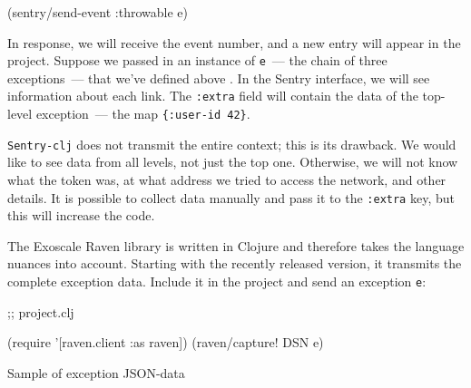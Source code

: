 \begin{clojure}
(sentry/send-event {:throwable e})
\end{clojure}

In response, we will receive the event number, and a new entry will appear in the project.
Suppose we passed in an instance of \verb|e|~--- the chain of three exceptions~--- that we've defined above . In the Sentry interface, we will see information about each link. The \verb|:extra| field will contain the data of the top-level exception~--- the map \verb|{:user-id 42}|.

\verb|Sentry-clj| does not transmit the entire context; this is its drawback. We would like to see data from all levels, not just the top one. Otherwise, we will not know what the token was, at what address we tried to access the network, and other details. It is possible to collect data manually and pass it to the \verb|:extra| key, but this will increase the code.


The Exoscale Raven library is written in Clojure and therefore takes the language nuances into account. Starting with the recently released version, it transmits the complete exception data. Include it in the project and send an exception \verb|e|:

\begin{clojure}
 ;; project.clj

(require '[raven.client :as raven])
(raven/capture! DSN e)
\end{clojure}

\begin{listing}[ht!]

\ifx\DEVICETYPE\MOBILE

\begin{json}
\end{json}

\else

\begin{json}
\end{json}

\fi

  \caption{Sample of exception JSON-data}
  \label{fig:ex-json-data}
\end{listing}

